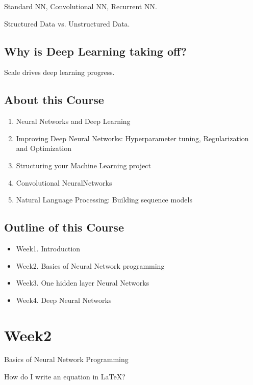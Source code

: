 \documentclass{article}
\begin{document}
Standard NN, Convolutional NN, Recurrent NN.

\noindent Structured Data vs. Unstructured Data.

\subsection{Why is Deep Learning taking off?}

Scale drives deep learning progress.

\subsection{About this Course}
    \begin{enumerate}
        \item Neural Networks and Deep Learning
        \item Improving Deep Neural Networks: Hyperparameter  tuning, Regularization and Optimization
        \item Structuring your Machine Learning project
        \item Convolutional NeuralNetworks
        \item Natural Language Processing: Building sequence models
    \end{enumerate}

\subsection{Outline of this Course}
    \begin{itemize}
        \item{Week1. Introduction}
        \item{Week2. Basics of Neural Network programming}
        \item{Week3. One hidden layer Neural Networks}
        \item{Week4. Deep Neural Networks}
    \end{itemize}


\newpage
\section{Week2}

    Basics of Neural Network Programming

    How do I write an equation in \LaTeX?\\

    \begin{center}
    \end{center}
\end{document}
